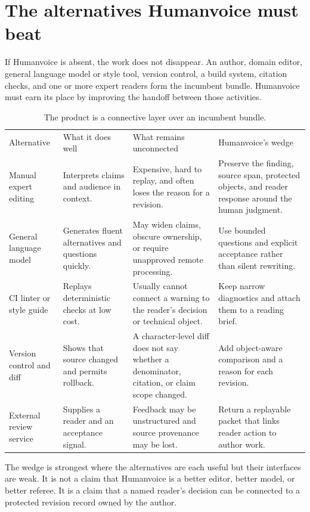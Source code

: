 \section{The alternatives Humanvoice must beat}
\label{sec:adoption-alternatives}

If Humanvoice is absent, the work does not disappear. An author, domain editor,
general language model or style tool, version control, a build system, citation
checks, and one or more expert readers form the incumbent bundle. Humanvoice
must earn its place by improving the handoff between those activities.

\begin{table}[H]
\centering
\small
\begin{tabularx}{\textwidth}{@{}p{}p{}p{}L@{}}
\toprule
Alternative & What it does well & What remains unconnected & Humanvoice's
wedge \\
Manual expert editing & Interprets claims and audience in context. & Expensive,
hard to replay, and often loses the reason for a revision. & Preserve the
finding, source span, protected objects, and reader response around the human
judgment. \\
General language model & Generates fluent alternatives and questions quickly.
& May widen claims, obscure ownership, or require unapproved remote processing.
& Use bounded questions and explicit acceptance rather than silent rewriting. \\
CI linter or style guide & Replays deterministic checks at low cost. & Usually
cannot connect a warning to the reader's decision or technical object. & Keep
narrow diagnostics and attach them to a reading brief. \\
Version control and diff & Shows that source changed and permits rollback. & A
character-level diff does not say whether a denominator, citation, or claim
scope changed. & Add object-aware comparison and a reason for each revision. \\
External review service & Supplies a reader and an acceptance signal. &
Feedback may be unstructured and source provenance may be lost. & Return a
replayable packet that links reader action to author work. \\
\bottomrule
\end{tabularx}
\caption{The product is a connective layer over an incumbent bundle.}
\label{tab:adoption-alternatives}
\end{table}

The wedge is strongest where the alternatives are each useful but their
interfaces are weak. It is not a claim that Humanvoice is a better editor,
better model, or better referee. It is a claim that a named reader's decision
can be connected to a protected revision record owned by the author.

